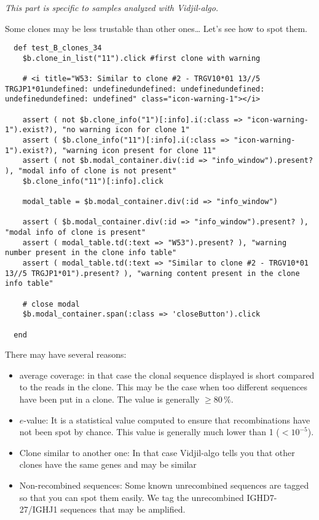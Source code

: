 \bigskip

\textit{This part is specific to samples analyzed with Vidjil-algo.}

Some clones may be less trustable than other ones\dots{} Let's see how to spot them.
\begin{verbatim}
  def test_B_clones_34
    $b.clone_in_list("11").click #first clone with warning

    # <i title="W53: Similar to clone #2 - TRGV10*01 13//5 TRGJP1*01undefined: undefinedundefined: undefinedundefined: undefinedundefined: undefined" class="icon-warning-1"></i>

    assert ( not $b.clone_info("1")[:info].i(:class => "icon-warning-1").exist?), "no warning icon for clone 1"
    assert ( $b.clone_info("11")[:info].i(:class => "icon-warning-1").exist?), "warning icon present for clone 11"
    assert ( not $b.modal_container.div(:id => "info_window").present? ), "modal info of clone is not present"
    $b.clone_info("11")[:info].click

    modal_table = $b.modal_container.div(:id => "info_window")
    
    assert ( $b.modal_container.div(:id => "info_window").present? ), "modal info of clone is present"
    assert ( modal_table.td(:text => "W53").present? ), "warning number present in the clone info table"
    assert ( modal_table.td(:text => "Similar to clone #2 - TRGV10*01 13//5 TRGJP1*01").present? ), "warning content present in the clone info table"

    # close modal
    $b.modal_container.span(:class => 'closeButton').click

  end
\end{verbatim}

There may have several reasons: 
\begin{itemize}
\item average coverage: in that case the clonal sequence displayed is short
  compared to the reads in the clone. This may be the case when too different
  sequences have been put in a clone. The value is generally $\geq 80\,\%$.
\item $e$-value: It is a statistical value computed to ensure that
  recombinations have not been spot by chance. This value is generally much
  lower than 1 ($<10^{-5}$).
\item Clone similar to another one: In that case Vidjil-algo tells you that
  other clones have the same genes and may be similar
\item Non-recombined sequences: Some known unrecombined sequences are tagged
  so that you can spot them easily. We tag the unrecombined IGHD7-27/IGHJ1
  sequences that may be amplified.
\end{itemize}

